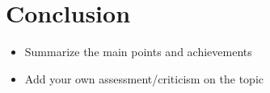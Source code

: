 \documentclass[12pt]%
{article}
\begin{document}
\section{Conclusion}

\begin{itemize}
\item Summarize the main points and achievements
\item Add your own assessment/criticism on the topic
\end{itemize}

\newpage

\printglossary[style=altlist,title=Glossary]
 
\printglossary[type=\acronymtype,style=long]
 
\printglossary[type=symbolslist,style=long]

\newpage



\end{document}
